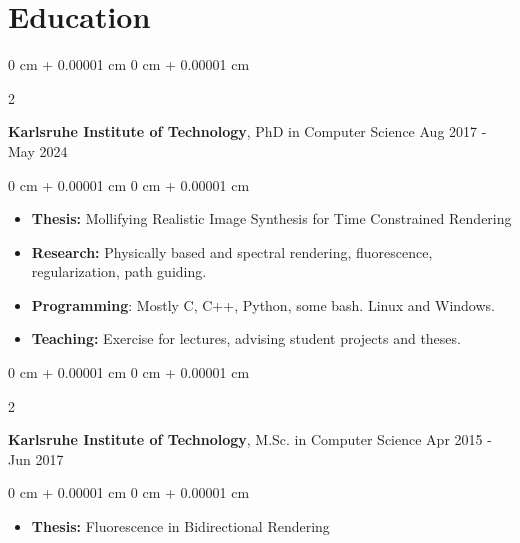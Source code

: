 \documentclass[10pt, letterpaper]{article}
\newenvironment{highlights}{
    \begin{itemize}[
        topsep=0.10 cm,
        parsep=0.10 cm,
        partopsep=0pt,
        itemsep=0pt,
        leftmargin=0 cm + 10pt
    ]
}{
    \end{itemize}
} %
\newenvironment{onecolentry}{
    \begin{adjustwidth}{
        0 cm + 0.00001 cm
    }{
        0 cm + 0.00001 cm
    }
}{
    \end{adjustwidth}
} %
\newenvironment{twocolentry}[2][]{
    \onecolentry
    \def\secondColumn{#2}
    \setcolumnwidth{\fill, 4.5 cm}
    \begin{paracol}{2}
}{
    \switchcolumn \raggedleft \secondColumn
    \end{paracol}
    \endonecolentry
} %
\begin{document}
\sectionspace
    \section{Education} 

    \newcommand{\expspace}{\vspace{.25cm}}
\newcommand{\educspace}{\expspace} 
\newcommand{\sectspacetop}{\vspace{.1cm}}
\sectspacetop
        \begin{twocolentry}{
            Aug 2017 - May 2024
        }
            \textbf{Karlsruhe Institute of Technology}, PhD in Computer Science\end{twocolentry}

        \vspace{0.10 cm}
        \begin{onecolentry}
            \begin{highlights}
            \item \textbf{Thesis:} Mollifying Realistic Image Synthesis for Time Constrained Rendering
                \item \textbf{Research:} Physically based and spectral rendering, fluorescence, regularization, path guiding.
                \item \textbf{Programming}: Mostly C, C++, Python, some bash. Linux and Windows.
                \item \textbf{Teaching:} Exercise for lectures, advising student projects and theses.
            \end{highlights}
        \end{onecolentry}

        \educspace

        \begin{twocolentry}{
            Apr 2015 - Jun 2017
        }
            \textbf{Karlsruhe Institute of Technology}, M.Sc. in Computer Science\end{twocolentry}

        \vspace{0.10 cm}
        \begin{onecolentry}
            \begin{highlights}
            \item \textbf{Thesis:} Fluorescence in Bidirectional Rendering
            \end{highlights}
        \end{onecolentry}
\end{document}
